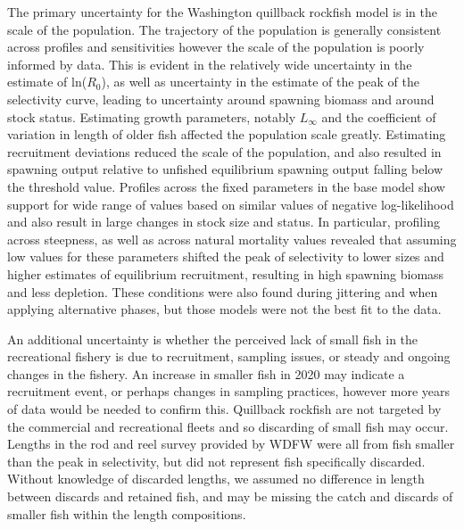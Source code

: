 \documentclass[11pt,
  english,
  letterpaper,
]{article}
\begin{document}
The primary uncertainty for the Washington quillback rockfish model is in the scale of the population. The trajectory of the population is generally consistent across profiles and sensitivities however the scale of the population is poorly informed by data. This is evident in the relatively wide uncertainty in the estimate of ln({\(R_0\)\leavevmode\tagmcend\tagstructend}), as well as uncertainty in the estimate of the peak of the selectivity curve, leading to uncertainty around spawning biomass and around stock status. Estimating growth parameters, notably {\(L_{\infty}\)\leavevmode\tagmcend\tagstructend} and the coefficient of variation in length of older fish affected the population scale greatly. Estimating recruitment deviations reduced the scale of the population, and also resulted in spawning output relative to unfished equilibrium spawning output falling below the threshold value. Profiles across the fixed parameters in the base model show support for wide range of values based on similar values of negative log-likelihood and also result in large changes in stock size and status. In particular, profiling across steepness, as well as across natural mortality values revealed that assuming low values for these parameters shifted the peak of selectivity to lower sizes and higher estimates of equilibrium recruitment, resulting in high spawning biomass and less depletion. These conditions were also found during jittering and when applying alternative phases, but those models were not the best fit to the data.

\leavevmode\tagmcend\tagstructend\par


An additional uncertainty is whether the perceived lack of small fish in the recreational fishery is due to recruitment, sampling issues, or steady and ongoing changes in the fishery. An increase in smaller fish in 2020 may indicate a recruitment event, or perhaps changes in sampling practices, however more years of data would be needed to confirm this. Quillback rockfish are not targeted by the commercial and recreational fleets and so discarding of small fish may occur. Lengths in the rod and reel survey provided by WDFW were all from fish smaller than the peak in selectivity, but did not represent fish specifically discarded. Without knowledge of discarded lengths, we assumed no difference in length between discards and retained fish, and may be missing the catch and discards of smaller fish within the length compositions.
\end{document}
